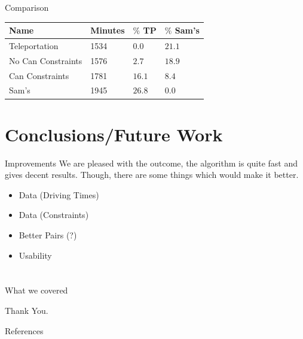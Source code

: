 \documentclass{beamer}
\begin{document}
\begin{frame}{Comparison}
	\begin{center}
	\begin{tabular}{llll}
		Name & Minutes & $\%$ TP & $\%$ Sam's\\
		\hline
		Teleportation & 1534 & $0.0$ & $21.1$ \\
		No Can Constraints & 1576 & $2.7$ & $18.9$ \\
		Can Constraints & 1781 & $16.1$ & $8.4$\\
		Sam's & 1945 & $26.8$ & $0.0$\\
	\end{tabular}
	\end{center}
\end{frame}

\section{Conclusions/Future Work} 
\begin{frame}{Improvements}
	We are pleased with the outcome, the algorithm is quite fast and gives decent results. Though, there are some things which would make it better.
	\begin{itemize}
		\item Data (Driving Times)
		\item Data (Constraints)
		\item Better Pairs (?)
		\item Usability
	\end{itemize}
\end{frame}

\section*{}
\begin{frame}{What we covered}
\begin{multicols}{2}
	\tableofcontents
\end{multicols}
\end{frame}

\begin{frame}
\centering Thank You.
\end{frame}

\begin{frame}{References}

\end{frame}
\end{document}

